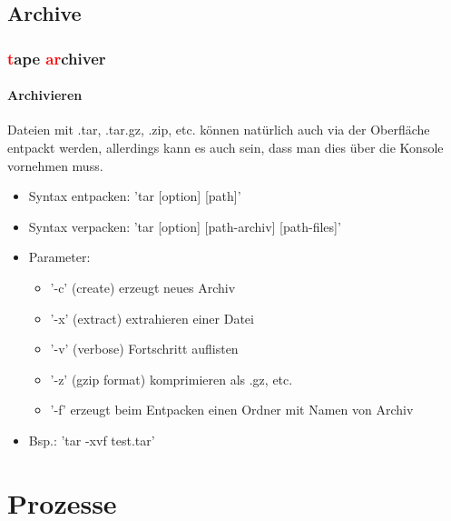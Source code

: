 \documentclass[12pt,utf8]{beamer}
\begin{document}
\subsection{Archive}
\begin{frame}
\frametitle{\textcolor{red}{t}ape \textcolor{red}{ar}chiver}
\framesubtitle{Archivieren}
Dateien mit .tar, .tar.gz, .zip, etc. können natürlich auch via der Oberfläche entpackt werden, allerdings kann es auch sein, dass man dies über die Konsole vornehmen muss.
\begin{itemize}[<+->]
	\item Syntax entpacken: 'tar [option] [path]'
	\item Syntax verpacken: 'tar [option] [path-archiv] [path-files]'
	\item Parameter:
	\begin{itemize}[<+->]
		\item '-c' (create) erzeugt neues Archiv
		\item '-x' (extract) extrahieren einer Datei
		\item '-v' (verbose) Fortschritt auflisten
		\item '-z' (gzip format) komprimieren als .gz, etc.
		\item '-f' erzeugt beim Entpacken einen Ordner mit Namen von Archiv
	\end{itemize}
	\item Bsp.: 'tar -xvf test.tar'
\end{itemize}
\end{frame}

\section{Prozesse}
\end{document}
